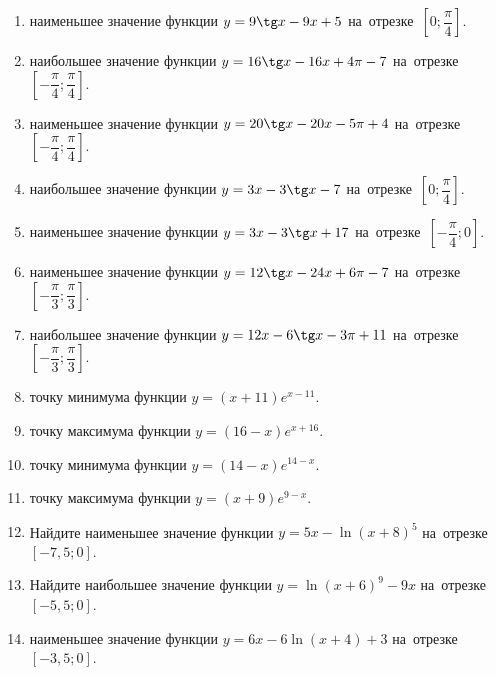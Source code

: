 \documentclass[a4paper,10pt]{article}
\begin{document}
\begin{enumerate}
\item {} наименьшее значение функции $y=9\tg x-9x+5$ на~отрезке~$\left[0;\dfrac{\pi }{4}\right]$.

\item {} наибольшее значение функции $y=16\tg x-16x+4\pi -7$ на~отрезке~$\left[-\dfrac{\pi }{4};\dfrac{\pi }{4}\right]$.

\item {} наименьшее значение функции $y=20\tg x-20x-5\pi +4$ на~отрезке~$\left[-\dfrac{\pi }{4};\dfrac{\pi }{4}\right]$.

\item {} наибольшее значение функции $y=3x-3\tg x-7$ на~отрезке~$\left[0;\dfrac{\pi }{4}\right]$.

\item {} наименьшее значение функции $y=3x-3\tg x+17$ на~отрезке~$\left[-\dfrac{\pi }{4};0\right]$.

\item {} наименьшее значение функции $y=12\tg x-24x+6\pi -7$ на~отрезке~$\left[-\dfrac{\pi }{3};\dfrac{\pi }{3}\right]$.

\item {} наибольшее значение функции $y=12x-6\tg x-3\pi +11$ на~отрезке~$\left[-\dfrac{\pi }{3};\dfrac{\pi }{3}\right]$.

\item {} точку минимума функции $y=\left(x+11\right)e^{x-11}$.

\item {} точку максимума функции $y=\left(16-x\right)e^{x+16}$.

\item {} точку минимума функции $y=\left(14-x\right)e^{14-x}$.

\item {} точку максимума функции $y=\left(x+9\right)e^{9-x}$.

\item Найдите наименьшее значение функции $y=5x-\ln \left(x+8\right)^5$ на~отрезке~$\left[-7,5;0\right]$.

\item Найдите наибольшее значение функции $y=\ln \left(x+6\right)^9-9x$ на~отрезке~$\left[-5,5;0\right]$.

\item {} наименьшее значение функции $y=6x-6\ln \left(x+4\right)+3$ на~отрезке~$\left[-3,5;0\right]$.


\end{enumerate}
\end{document}
